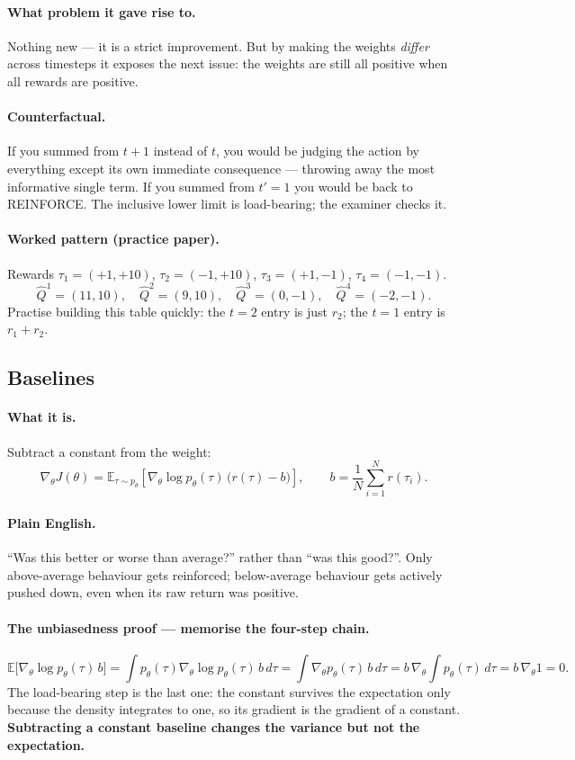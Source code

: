 \documentclass[11pt,a4paper]{article}
\begin{document}
\paragraph{What problem it gave rise to.} Nothing new --- it is a strict
improvement. But by making the weights \emph{differ} across timesteps it
exposes the next issue: the weights are still all positive when all rewards
are positive.

\paragraph{Counterfactual.} If you summed from $t+1$ instead of $t$, you would
be judging the action by everything except its own immediate consequence ---
throwing away the most informative single term. If you summed from $t'=1$ you
would be back to REINFORCE. The inclusive lower limit is load-bearing; the
examiner checks it.

\paragraph{Worked pattern (practice paper).} Rewards
$\tau_1=(+1,+10)$, $\tau_2=(-1,+10)$, $\tau_3=(+1,-1)$, $\tau_4=(-1,-1)$.
\[
\hat Q^1=(11,10),\quad \hat Q^2=(9,10),\quad \hat Q^3=(0,-1),\quad \hat Q^4=(-2,-1).
\]
Practise building this table quickly: the $t=2$ entry is just $r_2$; the $t=1$
entry is $r_1+r_2$.

\subsection{Baselines}

\paragraph{What it is.} Subtract a constant from the weight:
\[
\nabla_\theta J(\theta)=\mathbb E_{\tau\sim p_\theta}\!\left[
\nabla_\theta\log p_\theta(\tau)\,\bigl(r(\tau)-b\bigr)\right],
\qquad
b=\frac1N\sum_{i=1}^N r(\tau_i).
\]

\paragraph{Plain English.} ``Was this better or worse than average?'' rather
than ``was this good?''. Only above-average behaviour gets reinforced;
below-average behaviour gets actively pushed down, even when its raw return
was positive.

\paragraph{The unbiasedness proof --- memorise the four-step chain.}
\[
\mathbb E\bigl[\nabla_\theta\log p_\theta(\tau)\,b\bigr]
=\int p_\theta(\tau)\nabla_\theta\log p_\theta(\tau)\,b\,d\tau
=\int \nabla_\theta p_\theta(\tau)\,b\,d\tau
= b\,\nabla_\theta\!\int p_\theta(\tau)\,d\tau
= b\,\nabla_\theta 1 = 0 .
\]
The load-bearing step is the last one: the constant survives the expectation
only because the density integrates to one, so its gradient is the gradient of
a constant. \textbf{Subtracting a constant baseline changes the variance but
not the expectation.}
\end{document}
